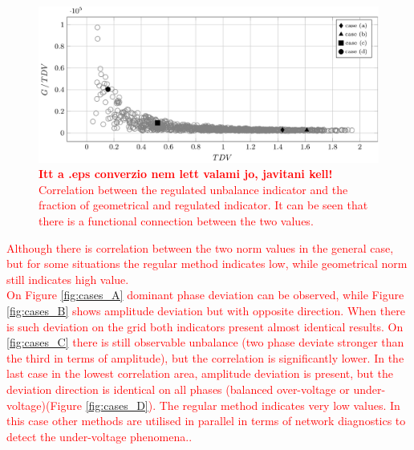             \begin{figure}[!ht]
           \centering
           \includegraphics[width=\textwidth,scale=0.95]{Unblance_EPS_Pics/EPS_images/side_scatter.eps}
           \caption{\textcolor{red}{\textbf{Itt a .eps converzio nem lett valami jo, javitani kell!} Correlation between the regulated unbalance indicator and the fraction of geometrical and regulated indicator. It can be seen that there is a functional connection between the two values.}}
           \label{fig:side_correlation}
            \end{figure}


            \textcolor{red}{Although there is correlation between the two norm values in the general case, but for some situations the regular method indicates low, while geometrical norm still indicates high value.\\
            On Figure \ref{fig:cases_A} dominant phase deviation can be observed, while Figure \ref{fig:cases_B} shows amplitude deviation but with opposite direction. When there is such deviation on the grid both indicators present almost identical results. On \ref{fig:cases_C} there is still observable unbalance (two phase deviate stronger than the third in terms of amplitude), but the correlation is significantly lower. In the last case in the lowest correlation area, amplitude deviation is present, but the deviation direction is identical on all phases (balanced over-voltage or under-voltage)(Figure \ref{fig:cases_D}). The regular method indicates very low values. In this case other methods are utilised in parallel in terms of network diagnostics to detect the under-voltage phenomena.\cite{arn1997under-voltage}.}


